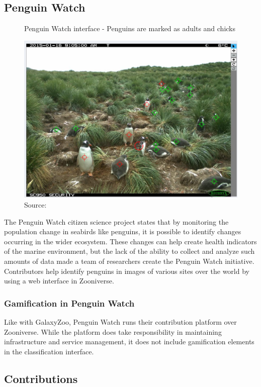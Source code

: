 \subsection{Penguin Watch}

\begin{figure}[ht]
    \centering
    \caption{Penguin Watch interface - Penguins are marked as adults and chicks}
    \includegraphics[width=0.8\linewidth]{images/background/penguinwatch.jpg}
    \caption*{Source: \cite{penguin2015watch}}
    \label{fig:oldweather-logbook}
\end{figure}

The Penguin Watch citizen science project states that by monitoring the population change in seabirds like penguins, it is possible to identify changes occurring in the wider ecosystem. These changes can help create health indicators of the marine environment, but the lack of the ability to collect and analyze such amounts of data made a team of researchers create the Penguin Watch initiative. Contributors help identify penguins in images of various sites over the world by using a web interface in Zooniverse.

\subsubsection{Gamification in Penguin Watch}

Like with GalaxyZoo, Penguin Watch runs their contribution platform over Zooniverse. While the platform does take responsibility in maintaining infrastructure and service management, it does not include gamification elements in the classification interface.

\subsection{Contributions}

